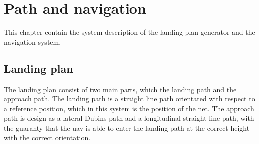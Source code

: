 \chapter{Path and navigation}\label{CH:PathNavigation}
This chapter contain the system description of the landing plan generator and the navigation system.
\section{Landing plan}\label{Ch:LandingPlan}
The landing plan consist of two main parts, which the landing path and the approach path. The landing path is a straight line path orientated with respect to a reference position, which in this system is the position of the net. The approach path is design as a lateral Dubins path and a longitudinal straight line path, with the guaranty  that the \gls{uav} is able to enter the landing path at the correct height with the correct orientation.
